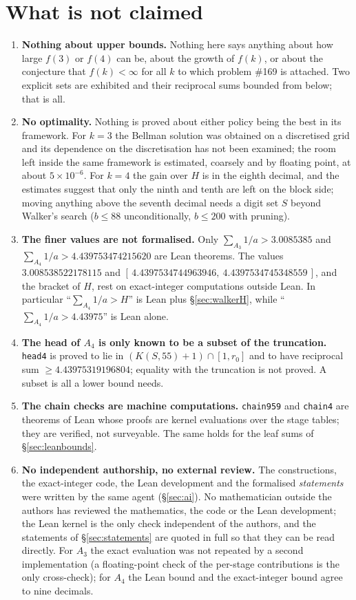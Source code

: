 \documentclass[11pt,a4paper]{article}
\theoremstyle{definition}
\theoremstyle{remark}
\newcommand{\code}[1]{\texttt{#1}}
\begin{document}
\section{What is not claimed}\label{sec:notclaimed}

\begin{enumerate}
\item \textbf{Nothing about upper bounds.} Nothing here says anything about how large $f(3)$ or $f(4)$ can be, about the growth of $f(k)$, or about the conjecture that $f(k) < \infty$ for all $k$ to which problem \#169 is attached. Two explicit sets are exhibited and their reciprocal sums bounded from below; that is all.
\item \textbf{No optimality.} Nothing is proved about either policy being the best in its framework. For $k=3$ the Bellman solution was obtained on a discretised grid and its dependence on the discretisation has not been examined; the room left inside the same framework is estimated, coarsely and by floating point, at about $5 \times 10^{-6}$. For $k=4$ the gain over $H$ is in the eighth decimal, and the estimates suggest that only the ninth and tenth are left on the block side; moving anything above the seventh decimal needs a digit set $S$ beyond Walker's search ($b \le 88$ unconditionally, $b \le 200$ with pruning).
\item \textbf{The finer values are not formalised.} Only $\sum_{A_3} 1/a > 3.0085385$ and $\sum_{A_4} 1/a > 4.439753474215620$ are Lean theorems. The values $3.008538522178115$ and $[\,4.4397534744963946,\ 4.4397534745348559\,]$, and the bracket of $H$, rest on exact-integer computations outside Lean. In particular ``$\sum_{A_4} 1/a > H$'' is Lean plus \S\ref{sec:walkerH}, while ``$\sum_{A_4} 1/a > 4.43975$'' is Lean alone.
\item \textbf{The head of $A_4$ is only known to be a subset of the truncation.} \code{head4} is proved to lie in $(K(S,55)+1) \cap [1, r_0]$ and to have reciprocal sum $\ge 4.43975319196804$; equality with the truncation is not proved. A subset is all a lower bound needs.
\item \textbf{The chain checks are machine computations.} \code{chain959} and \code{chain4} are theorems of Lean whose proofs are kernel evaluations over the stage tables; they are verified, not surveyable. The same holds for the leaf sums of \S\ref{sec:leanbounds}.
\item \textbf{No independent authorship, no external review.} The constructions, the exact-integer code, the Lean development and the formalised \emph{statements} were written by the same agent (\S\ref{sec:ai}). No mathematician outside the authors has reviewed the mathematics, the code or the Lean development; the Lean kernel is the only check independent of the authors, and the statements of \S\ref{sec:statements} are quoted in full so that they can be read directly. For $A_3$ the exact evaluation was not repeated by a second implementation (a floating-point check of the per-stage contributions is the only cross-check); for $A_4$ the Lean bound and the exact-integer bound agree to nine decimals.

\end{enumerate}
\end{document}
